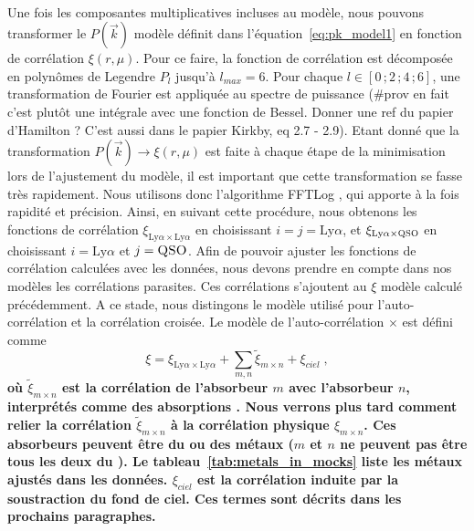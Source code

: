 \documentclass[11pt, twoside, a4paper, openright]{report}
\begin{document}
\paragraph{}
Une fois les composantes multiplicatives incluses au modèle, nous pouvons transformer le $P(\vec k)$ modèle définit dans l'équation~\ref{eq:pk_model1} en fonction de corrélation $\xi(r, \mu)$.
Pour ce faire,
la fonction de corrélation est décomposée en polynômes de Legendre $P_l$ jusqu'à $l_{max} = 6$. Pour chaque $l \in [0 \, ; 2 \, ; 4\, ; 6]$, une transformation de Fourier est appliquée au spectre de puissance (\#prov en fait c'est plutôt une intégrale avec une fonction de Bessel. Donner une ref du papier d'Hamilton ? C'est aussi dans le papier Kirkby, eq 2.7 - 2.9). Etant donné que la transformation $P(\vec k) \rightarrow \xi(r, \mu)$ est faite à chaque étape de la minimisation lors de l'ajustement du modèle, il est important que cette transformation se fasse très rapidement. Nous utilisons donc l'algorithme FFTLog \autocite{Hamilton1999}, qui apporte à la fois rapidité et précision.
Ainsi, en suivant cette procédure, nous obtenons les fonctions de corrélation $\xi_{\mathrm{Ly}\alpha\times\mathrm{Ly}\alpha}$ en choisissant $i = j = \mathrm{Ly}\alpha$, et $\xi_{\mathrm{Ly}\alpha\times\textsc{QSO}}$ en choisissant $i = \mathrm{Ly}\alpha$ et $j = \textsc{QSO}$.
Afin de pouvoir ajuster les fonctions de corrélation calculées avec les données, nous devons prendre en compte dans nos modèles les corrélations parasites. Ces corrélations s'ajoutent au $\xi$ modèle calculé précédemment.
A ce stade, nous distingons le modèle utilisé pour l'auto-corrélation et la corrélation croisée.
Le modèle de l'auto-corrélation \lya{}$\times$\lya{} est défini comme
\begin{equation}
  \label{eq:cf_model1}
  \xi = \xi_{\mathrm{Ly}\alpha\times\mathrm{Ly}\alpha}  + \sum_{m, n} \tilde \xi_{m\times n} + \xi_{ciel}  \; ,
\end{equation}
\textbf{où $\tilde \xi_{m \times n}$ est la corrélation de l'absorbeur $m$ avec l'absorbeur $n$, interprétés comme des absorptions \lya{}.
  Nous verrons plus tard comment relier la  corrélation $\tilde \xi_{m \times n}$ à la corrélation physique $\xi_{m \times n}$.
  Ces absorbeurs peuvent être du \lya{} ou des métaux ($m$ et $n$ ne peuvent pas être tous les deux du \lya{}). Le tableau~\ref{tab:metals_in_mocks} liste les métaux ajustés dans les données. $\xi_{ciel}$ est la corrélation induite par la soustraction du fond de ciel. Ces termes sont décrits dans les prochains paragraphes.}
\end{document}
